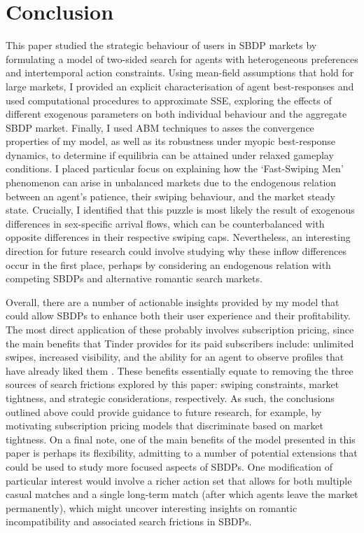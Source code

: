 \section{Conclusion}
\label{sec:section5}
This paper studied the strategic behaviour of users in SBDP markets by formulating a model of two-sided search for agents with heterogeneous preferences and intertemporal action constraints. 
Using mean-field assumptions that hold for large markets, I provided an explicit characterisation of agent best-responses and used computational procedures to approximate SSE, exploring the effects of different exogenous parameters on both individual behaviour and the aggregate SBDP market.
Finally, I used ABM techniques to asses the convergence properties of my model, as well as its robustness under myopic best-response dynamics, to determine if equilibria can be attained under relaxed gameplay conditions.
I placed particular focus on explaining how the `Fast-Swiping Men' phenomenon can arise in unbalanced markets due to the endogenous relation between an agent's patience, their swiping behaviour, and the market steady state. 
Crucially, I identified that this puzzle is most likely the result of exogenous differences in sex-specific arrival flows, which can be counterbalanced with opposite differences in their respective swiping caps. 
Nevertheless, an interesting direction for future research could involve studying why these inflow differences occur in the first place, perhaps by considering an endogenous relation with competing SBDPs and alternative romantic search markets. 

Overall, there are a number of actionable insights provided by my model that could allow SBDPs to enhance both their user experience and their profitability.
The most direct application of these probably involves subscription pricing, since the main benefits that Tinder provides for its paid subscribers include: unlimited swipes, increased visibility, and the ability for an agent to observe profiles that have already liked them \citep{web:tinder_subscription}.
These benefits essentially equate to removing the three sources of search frictions explored by this paper: swiping constraints, market tightness, and strategic considerations, respectively.
As such, the conclusions outlined above could provide guidance to future research, for example, by motivating subscription pricing models that discriminate based on market tightness.
On a final note, one of the main benefits of the model presented in this paper is perhaps its flexibility, admitting to a number of potential extensions that could be used to study more focused aspects of SBDPs. 
One modification of particular interest would involve a richer action set that allows for both multiple casual matches and a single long-term match (after which agents leave the market permanently), which might uncover interesting insights on romantic incompatibility and associated search frictions in SBDPs.